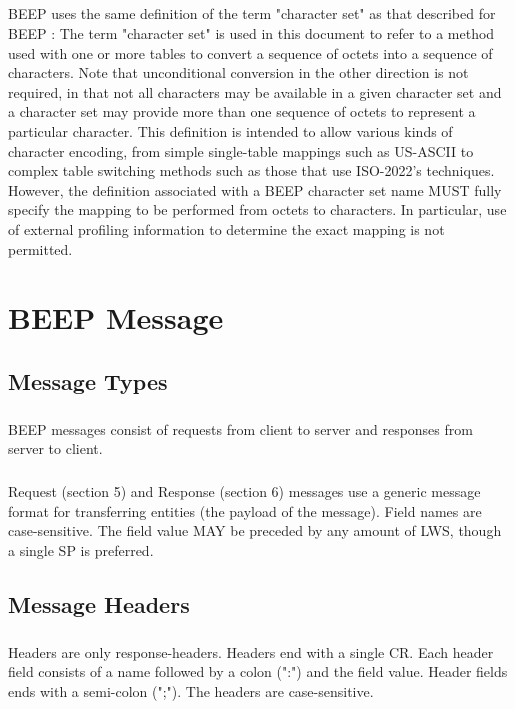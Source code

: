         \paragraph{}
      BEEP uses the same definition of the term "character set" as that
   described for BEEP :
      The term "character set" is used in this document to refer to a
   method used with one or more tables to convert a sequence of octets
   into a sequence of characters. Note that unconditional conversion in
   the other direction is not required, in that not all characters may
   be available in a given character set and a character set may provide
   more than one sequence of octets to represent a particular character.
   This definition is intended to allow various kinds of character
   encoding, from simple single-table mappings such as US-ASCII to
   complex table switching methods such as those that use ISO-2022's
   techniques. However, the definition associated with a BEEP character
   set name MUST fully specify the mapping to be performed from octets
   to characters. In particular, use of external profiling information
   to determine the exact mapping is not permitted.


    \clearpage
\chapter{BEEP Message}
    \section{Message Types}
        \paragraph{}
   BEEP messages consist of requests from client to server and responses
   from server to client.
        \paragraph{}
   Request (section 5) and Response (section 6) messages use a generic
   message format for transferring entities (the payload of the
   message). Field names are case-sensitive. The field value MAY be
   preceded by any amount of LWS, though a single SP is preferred.

    \section{Message Headers}
        \paragraph{}
   Headers are only response-headers. Headers end with a single CR.
   Each header field consists of a name followed by a colon (":") and
   the field value. Header fields ends with a semi-colon (";"). The
   headers are case-sensitive.

